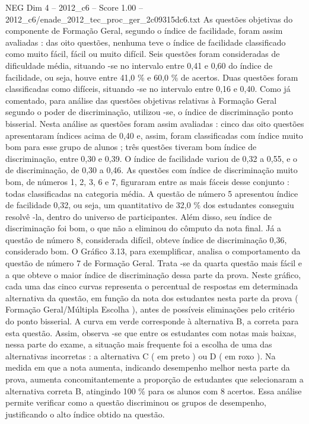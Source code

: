 \begin{textsample}{NEG Dim 4 – 2012\_c6 – Score 1.00 – 2012\_c6/enade\_2012\_tec\_proc\_ger\_2c09315dc6.txt}
As questões objetivas do componente de Formação Geral, segundo o índice de facilidade, foram assim avaliadas : das oito questões, nenhuma teve o índice de facilidade classificado como muito fácil, fácil ou muito difícil.
Seis questões foram consideradas de dificuldade média, situando -se no intervalo entre 0,41 e 0,60 do índice de facilidade, ou seja, houve entre 41,0 \% e 60,0 \% de acertos.
Duas questões foram classificadas como difíceis, situando -se no intervalo entre 0,16 e 0,40.
Como já comentado, para análise das questões objetivas relativas à Formação Geral segundo o poder de discriminação, utilizou -se, o índice de discriminação ponto bisserial.
Nesta análise as questões foram assim avaliadas : cinco das oito questões apresentaram índices acima de 0,40 e, assim, foram classificadas com índice muito bom para esse grupo de alunos ; três questões tiveram bom índice de discriminação, entre 0,30 e 0,39.
O índice de facilidade variou de 0,32 a 0,55, e o de discriminação, de 0,30 a 0,46.
As questões com índice de discriminação muito bom, de números 1, 2, 3, 6 e 7, figuraram entre as mais fáceis desse conjunto : todas classificadas na categoria média.
A questão de número 5 apresentou índice de facilidade 0,32, ou seja, um quantitativo de 32,0 \% dos estudantes conseguiu resolvê -la, dentro do universo de participantes.
Além disso, seu índice de discriminação foi bom, o que não a eliminou do cômputo da nota final.
Já a questão de número 8, considerada difícil, obteve índice de discriminação 0,36, considerado bom.
O Gráfico 3.13, para exemplificar, analisa o comportamento da questão de número 7 de Formação Geral.
Trata -se da quarta questão mais fácil e a que obteve o maior índice de discriminação dessa parte da prova.
Neste gráfico, cada uma das cinco curvas representa o percentual de respostas em determinada alternativa da questão, em função da nota dos estudantes nesta parte da prova ( Formação Geral/Múltipla Escolha ), antes de possíveis eliminações pelo critério do ponto bisserial.
A curva em verde corresponde à alternativa B, a correta para esta questão.
Assim, observa -se que entre os estudantes com notas mais baixas, nessa parte do exame, a situação mais frequente foi a escolha de uma das alternativas incorretas : a alternativa C ( em preto ) ou D ( em roxo ).
Na medida em que a nota aumenta, indicando desempenho melhor nesta parte da prova, aumenta concomitantemente a proporção de estudantes que selecionaram a alternativa correta B, atingindo 100 \% para os alunos com 8 acertos.
Essa análise permite verificar como a questão discriminou os grupos de desempenho, justificando o alto índice obtido na questão.

\end{textsample}
